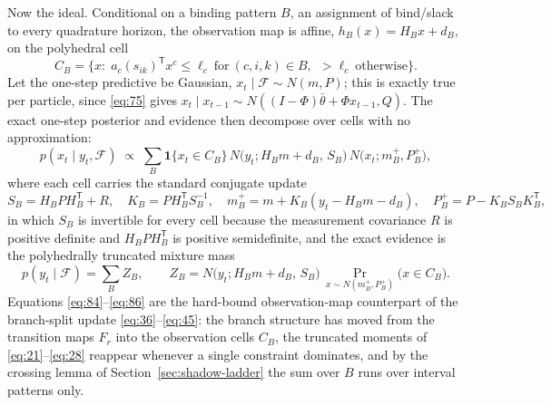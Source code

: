 \documentclass[11pt]{article}
\begin{document}
Now the ideal. Conditional on a binding pattern \(B\), an assignment
of bind/slack to every quadrature horizon, the observation map is
affine, \(h_B(x)=H_Bx+d_B\), on the polyhedral cell
\begin{equation}\label{eq:83}
 C_B=\bigl\{x:\;a_c(s_{ik})^{\mathsf T}x^c\leq\ell_c\ \text{for}\
 (c,i,k)\in B,\ \ >\ell_c\ \text{otherwise}\bigr\}.
\end{equation}
Let the one-step predictive be Gaussian,
\(x_t\mid\mathcal F\sim N(m,P)\); this is exactly true per particle, since
\eqref{eq:75} gives
\(x_t\mid x_{t-1}\sim N((I-\Phi)\bar\theta+\Phi x_{t-1},Q)\). The exact
one-step posterior and evidence then decompose over cells with no
approximation:
\begin{equation}\label{eq:84}
 p(x_t\mid y_t,\mathcal F)\;\propto\;
 \sum_{B}\mathbf 1\{x_t\in C_B\}\,
 N\!\bigl(y_t;H_Bm+d_B,\,S_B\bigr)\,
 N\!\bigl(x_t;m_B^+,P_B^+\bigr),
\end{equation}
where each cell carries the standard conjugate update
\begin{equation}\label{eq:85}
 S_B=H_BPH_B^{\mathsf T}+R,\quad
 K_B=PH_B^{\mathsf T}S_B^{-1},\quad
 m_B^+=m+K_B(y_t-H_Bm-d_B),\quad
 P_B^+=P-K_BS_BK_B^{\mathsf T},
\end{equation}
in which \(S_B\) is invertible for every cell because the measurement
covariance \(R\) is positive definite and \(H_BPH_B^{\mathsf T}\) is
positive semidefinite, and the exact evidence is the polyhedrally
truncated mixture mass
\begin{equation}\label{eq:86}
 p(y_t\mid\mathcal F)=\sum_B Z_B,
 \qquad
 Z_B=N\!\bigl(y_t;H_Bm+d_B,\,S_B\bigr)\,
 \Pr_{x\sim N(m_B^+,P_B^+)}\!\bigl(x\in C_B\bigr).
\end{equation}
Equations \eqref{eq:84}--\eqref{eq:86} are the hard-bound
observation-map counterpart of the branch-split update
\eqref{eq:36}--\eqref{eq:45}: the branch structure has moved from the
transition maps \(F_r\) into the observation cells \(C_B\), the
truncated moments of \eqref{eq:21}--\eqref{eq:28} reappear whenever a
single constraint dominates, and by the crossing lemma of
Section~\ref{sec:shadow-ladder} the sum over \(B\) runs over interval patterns
only.
\end{document}
